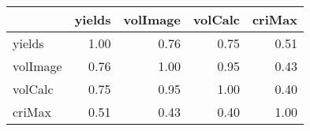 \begin{tabular}{lrrrr}
\toprule
{} &  yields &  volImage &  volCalc &  criMax \\
\midrule
yields   &    1.00 &      0.76 &     0.75 &    0.51 \\
volImage &    0.76 &      1.00 &     0.95 &    0.43 \\
volCalc  &    0.75 &      0.95 &     1.00 &    0.40 \\
criMax   &    0.51 &      0.43 &     0.40 &    1.00 \\
\bottomrule
\end{tabular}
